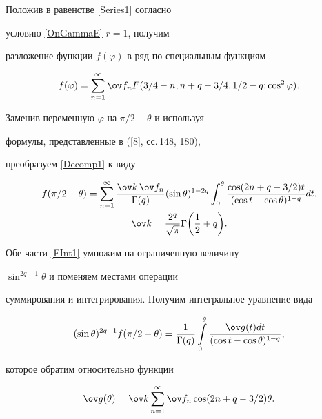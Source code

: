 Положив в равенстве \eqref{Series1} согласно


условию \eqref{OnGammaE} $r=1$, получим


разложение функции $f(\varphi)$ в ряд по специальным функциям


\begin{equation}\label{Decomp1}


f(\varphi)=\sum_{n=1}^\infty \ov f_n


F({3/4-n},{n+q-3/4},{1/2-q};{\cos^2\varphi}).


\end{equation}


Заменив переменную $\varphi$ на $\pi/2-\theta$ и используя 


формулы, представленные в ([8], сс.\,148, 180),


преобразуем \eqref{Decomp1} к виду


\begin{gather}\label{FInt1}


f(\pi/2-\theta)=\sum\limits_{n=1}^\infty


\frac{\ov k\,\ov f_n}{\Gamma(q)} (\sin\theta)^{1-2q}


\int_0^\theta\frac{\cos(2n+q-3/2)t}{(\cos t- \cos \theta)^{1-q}} dt, \\


%


\ov k=\frac{2^{q}}{\sqrt{\pi}}\Gamma\bigg(\frac{1}{2}+q\bigg).\notag


\end{gather}


Обе части \eqref{FInt1} умножим на ограниченную величину


$\sin^{2q-1}\theta$ и поменяем местами операции


суммирования и интегрирования. Получим интегральное уравнение вида


$$


(\sin\theta)^{2q-1}f(\pi/2-\theta) =


\frac{1}{\Gamma(q)} \int\limits_0^\theta \frac{\ov g(t)dt}{(\cos t


-\cos\theta)^{1-q}},


$$


которое обратим относительно функции


\begin{equation}\label{G1}


\ov g(\theta) = \ov k \sum\limits_{n=1}^\infty \ov f_n \cos(2n+q-3/2)\theta.


\end{equation}


